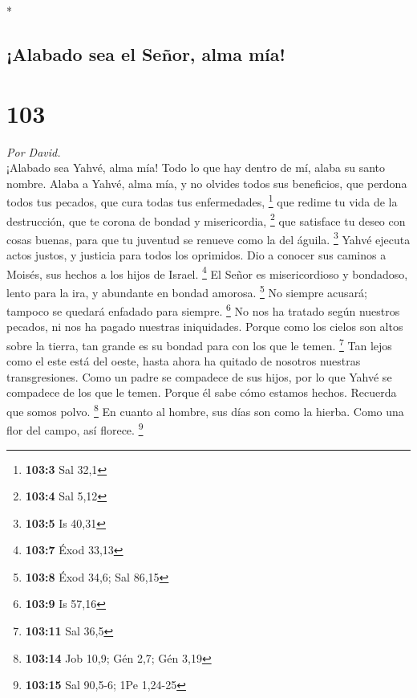 \begin{paracol}{2}
\begin{otherlanguage}{english}
\end{otherlanguage}

\switchcolumn[0]*

\hypertarget{alabado-sea-el-seuxf1or-alma-muxeda}{%
\subsection{¡Alabado sea el Señor, alma
mía!}\label{alabado-sea-el-seuxf1or-alma-muxeda}}

\hypertarget{section-204}{%
\section{103}\label{section-204}}

\emph{Por David.}\\
 ¡Alabado sea Yahvé, alma mía! Todo lo que hay dentro de
mí, alaba su santo nombre.  Alaba a Yahvé, alma mía, y no
olvides todos sus beneficios,  que perdona todos tus
pecados, que cura todas tus enfermedades, \footnote{\textbf{103:3} Sal
  32,1}  que redime tu vida de la destrucción, que te
corona de bondad y misericordia, \footnote{\textbf{103:4} Sal 5,12}
 que satisface tu deseo con cosas buenas, para que tu
juventud se renueve como la del águila. \footnote{\textbf{103:5} Is
  40,31}  Yahvé ejecuta actos justos, y justicia para
todos los oprimidos.  Dio a conocer sus caminos a Moisés,
sus hechos a los hijos de Israel. \footnote{\textbf{103:7} Éxod 33,13}
 El Señor es misericordioso y bondadoso, lento para la
ira, y abundante en bondad amorosa. \footnote{\textbf{103:8} Éxod 34,6;
  Sal 86,15}  No siempre acusará; tampoco se quedará
enfadado para siempre. \footnote{\textbf{103:9} Is 57,16}
 No nos ha tratado según nuestros pecados, ni nos ha
pagado nuestras iniquidades.  Porque como los cielos son
altos sobre la tierra, tan grande es su bondad para con los que le
temen. \footnote{\textbf{103:11} Sal 36,5}  Tan lejos
como el este está del oeste, hasta ahora ha quitado de nosotros nuestras
transgresiones.  Como un padre se compadece de sus hijos,
por lo que Yahvé se compadece de los que le temen. 
Porque él sabe cómo estamos hechos. Recuerda que somos polvo.
\footnote{\textbf{103:14} Job 10,9; Gén 2,7; Gén 3,19} 
En cuanto al hombre, sus días son como la hierba. Como una flor del
campo, así florece. \footnote{\textbf{103:15} Sal 90,5-6; 1Pe 1,24-25}

\end{paracol}
